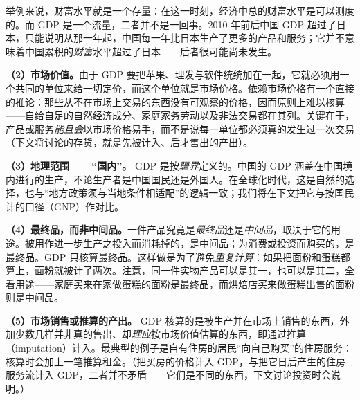 举例来说，财富水平就是一个存量：在这一时刻，经济中总的财富水平是可以测度的。而 GDP 是一个流量，二者并不是一回事。2010 年前后中国 GDP 超过了日本，只能说明从那一年起，中国每一年比日本生产了更多的产品和服务；它并不意味着中国累积的\emph{财富}水平超过了日本——后者很可能尚未发生。



\textbf{（2）市场价值。}由于 GDP 要把苹果、理发与软件统统加在一起，它就必须用一个共同的单位来给一切定价，而这个单位就是市场价格。依赖市场价格有一个直接的推论：那些从不在市场上交易的东西没有可观察的价格，因而原则上难以核算——自给自足的自然经济成分、家庭家务劳动以及非法交易都在其列。关键在于，产品或服务\emph{能且会}以市场价格易手，而不是说每一单位都必须真的发生过一次交易（下文将讨论的存货，就是先被计入、后才售出的产出）。

\textbf{（3）地理范围——“国内”。} GDP 是按\emph{疆界}定义的。中国的 GDP 涵盖在中国境内进行的生产，不论生产者是中国国民还是外国人。在全球化时代，这是自然的选择，也与“地方政策须与当地条件相适配”的逻辑一致；我们将在下文把它与按国民计的口径（GNP）作对比。

\textbf{（4）最终品，而非中间品。}一件产品究竟是\emph{最终品}还是\emph{中间品}，取决于它的用途。被用作进一步生产之投入而消耗掉的，是中间品；为消费或投资而购买的，是最终品。GDP 只核算最终品。这样做是为了避免\emph{重复计算}：如果把面粉和蛋糕都算上，面粉就被计了两次。注意，同一件实物产品可以是其一，也可以是其二，全看用途——家庭买来在家做蛋糕的面粉是最终品，而烘焙店买来做蛋糕出售的面粉则是中间品。

\textbf{（5）市场销售或推算的产出。} GDP 核算的是被生产并在市场上销售的东西，外加少数几样并非真的售出、却\emph{理应}按市场价值估算的东西，即通过推算（imputation）计入。最典型的例子是自有住房的居民“向自己购买”的住房服务：核算时会加上一笔推算租金。（把买房的价格计入 GDP，与把它日后产生的住房服务流计入 GDP，二者并不矛盾——它们是不同的东西，下文讨论投资时会说明。）

